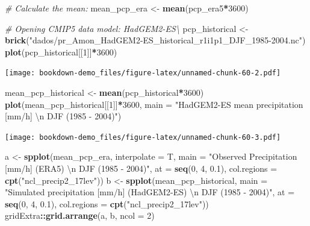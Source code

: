 \documentclass[]{book}
\newenvironment{Shaded}{\begin{snugshade}}{\end{snugshade}}
\newcommand{\CharTok}[1]{\textcolor[rgb]{0.31,0.60,0.02}{#1}}
\newcommand{\CommentTok}[1]{\textcolor[rgb]{0.56,0.35,0.01}{\textit{#1}}}
\newcommand{\DataTypeTok}[1]{\textcolor[rgb]{0.13,0.29,0.53}{#1}}
\newcommand{\DecValTok}[1]{\textcolor[rgb]{0.00,0.00,0.81}{#1}}
\newcommand{\FloatTok}[1]{\textcolor[rgb]{0.00,0.00,0.81}{#1}}
\newcommand{\KeywordTok}[1]{\textcolor[rgb]{0.13,0.29,0.53}{\textbf{#1}}}
\newcommand{\NormalTok}[1]{#1}
\newcommand{\OperatorTok}[1]{\textcolor[rgb]{0.81,0.36,0.00}{\textbf{#1}}}
\newcommand{\StringTok}[1]{\textcolor[rgb]{0.31,0.60,0.02}{#1}}
\begin{document}
\begin{Shaded}
\begin{Highlighting}[]
\CommentTok{# Calculate the mean:}
\NormalTok{mean_pcp_era <-}\StringTok{ }\KeywordTok{mean}\NormalTok{(pcp_era5}\OperatorTok{*}\DecValTok{3600}\NormalTok{)}

\CommentTok{# Opening CMIP5 data model: HadGEM2-ES\textbackslash{}}
\NormalTok{pcp_historical <-}\StringTok{ }\KeywordTok{brick}\NormalTok{(}\StringTok{"dados/pr_Amon_HadGEM2-ES_historical_r1i1p1_DJF_1985-2004.nc"}\NormalTok{)}
\KeywordTok{plot}\NormalTok{(pcp_historical[[}\DecValTok{1}\NormalTok{]]}\OperatorTok{*}\DecValTok{3600}\NormalTok{)}
\end{Highlighting}
\end{Shaded}

\texttt{[image: bookdown-demo\_files/figure-latex/unnamed-chunk-60-2.pdf]}

\begin{Shaded}
\begin{Highlighting}[]
\NormalTok{mean_pcp_historical <-}\StringTok{ }\KeywordTok{mean}\NormalTok{(pcp_historical}\OperatorTok{*}\DecValTok{3600}\NormalTok{)}
\KeywordTok{plot}\NormalTok{(mean_pcp_historical[[}\DecValTok{1}\NormalTok{]]}\OperatorTok{*}\DecValTok{3600}\NormalTok{,}
     \DataTypeTok{main =} \StringTok{"HadGEM2-ES mean precipitation [mm/h] }\CharTok{\textbackslash{}n}\StringTok{ DJF (1985 - 2004)"}\NormalTok{)}
\end{Highlighting}
\end{Shaded}

\texttt{[image: bookdown-demo\_files/figure-latex/unnamed-chunk-60-3.pdf]}

\begin{Shaded}
\begin{Highlighting}[]
\NormalTok{a <-}\StringTok{ }\KeywordTok{spplot}\NormalTok{(mean_pcp_era, }\DataTypeTok{interpolate =}\NormalTok{ T,}
            \DataTypeTok{main =} \StringTok{"Observed Precipitation [mm/h] (ERA5) }\CharTok{\textbackslash{}n}\StringTok{ DJF (1985 - 2004)"}\NormalTok{,}
            \DataTypeTok{at =} \KeywordTok{seq}\NormalTok{(}\DecValTok{0}\NormalTok{, }\DecValTok{4}\NormalTok{, }\FloatTok{0.1}\NormalTok{),}
            \DataTypeTok{col.regions =} \KeywordTok{cpt}\NormalTok{(}\StringTok{"ncl_precip2_17lev"}\NormalTok{))}
\NormalTok{b <-}\StringTok{ }\KeywordTok{spplot}\NormalTok{(mean_pcp_historical,}
            \DataTypeTok{main =} \StringTok{"Simulated precipitation [mm/h] (HadGEM2-ES) }\CharTok{\textbackslash{}n}\StringTok{ DJF (1985 - 2004)"}\NormalTok{,}
            \DataTypeTok{at =} \KeywordTok{seq}\NormalTok{(}\DecValTok{0}\NormalTok{, }\DecValTok{4}\NormalTok{, }\FloatTok{0.1}\NormalTok{),}
            \DataTypeTok{col.regions =} \KeywordTok{cpt}\NormalTok{(}\StringTok{"ncl_precip2_17lev"}\NormalTok{))}
\NormalTok{gridExtra}\OperatorTok{::}\KeywordTok{grid.arrange}\NormalTok{(a, b, }\DataTypeTok{ncol =} \DecValTok{2}\NormalTok{)}
\end{Highlighting}
\end{Shaded}
\end{document}
